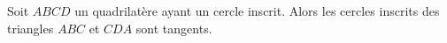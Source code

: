 Soit $ABCD$ un quadrilatère ayant un cercle inscrit. Alors les cercles inscrits des triangles $ABC$ et $CDA$ sont tangents.
